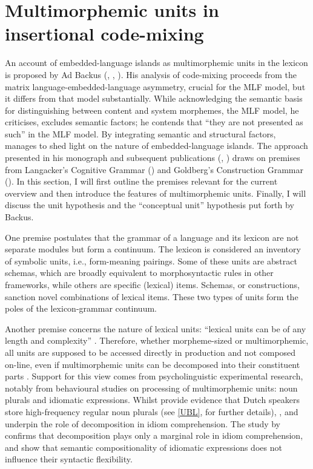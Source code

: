 \section{Multimorphemic units in insertional code-mixing}{\label{unit-hypothesis}}
An account of embedded-language islands as multimorphemic units in the lexicon is proposed by Ad Backus (\citeyear{backus-two-1996}, \citeyear{backus-evidence-1999}, \citeyear{backus-units-2003}). His analysis of code-mixing proceeds from the matrix language-embedded-language asymmetry, crucial for the MLF model, but it differs from that model substantially. While acknowledging the semantic basis for distinguishing between content and system morphemes, the MLF model, he criticises, excludes semantic factors; he contends that ``they are not presented as such'' \citep[115]{backus-two-1996} in the MLF model. By integrating semantic and structural factors, \citet{backus-evidence-1999, backus-units-2003} manages to shed light on the nature of embedded-language islands. The approach presented in his \citeyear{backus-two-1996} monograph and subsequent publications (\citeyear{backus-evidence-1999}, \citeyear{backus-units-2003}) draws on premises from Langacker's Cognitive Grammar (\citeyear{langacker-foundations-1987,langacker-foundations-1991}) and Goldberg's Construction Grammar (\citeyear{goldberg-1995}). In this section, I will first outline the premises relevant for the current overview and then introduce the features of multimorphemic units. Finally, I will discuss the unit hypothesis and the ``conceptual unit'' hypothesis put forth by Backus.

One premise postulates that the grammar of a language and its lexicon are not separate modules but form a continuum. The lexicon is considered an inventory of symbolic units, i.e., form-meaning pairings. Some of these units are abstract schemas, which are broadly equivalent to morphosyntactic rules in other frameworks, while others are specific (lexical) items. Schemas, or constructions, sanction novel combinations of lexical items. These two types of units form the poles of the lexicon-grammar continuum.

Another premise concerns the nature of lexical units: ``lexical units can be of any length and complexity'' \citep[84]{backus-units-2003}. Therefore, whether morpheme-sized or multimorphemic, all units are supposed to be accessed directly in production and not composed on-line, even if multimorphemic units can be decomposed into their constituent parts \citep[cf.][129]{backus-two-1996}. Support for this view comes from psycholinguistic experimental research, notably from behavioural studies on processing of multimorphemic units: noun plurals and idiomatic expressions. Whilst \citet{baayen-dijkstra-schreuder} provide evidence that Dutch speakers store high-frequency regular noun plurals (see \ref{UBL}, for further details), \citet{libben-multidetermined-2008}, and \citet{tabossi-processing-2008} underpin the role of decomposition in idiom comprehension. The study by \citet{libben-multidetermined-2008} confirms that decomposition plays only a marginal role in idiom comprehension, and \citet{tabossi-processing-2008} show that semantic compositionality of idiomatic expressions does not influence their syntactic flexibility. 

